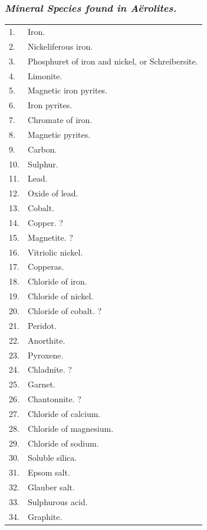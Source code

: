 \documentclass[a4paper, 12pt, oneside]{article}
\begin{document}
\subsubsection{\emph{Mineral Species found in Aërolites.}}
\begin{table}[H]
    \centering
    \bfseries
    \Fontauri
    \footnotesize
    \begin{tabular}{l l}
        1. & Iron. \\
        2. & Nickeliferous iron. \\
        3. & Phosphuret of iron and nickel, or Schreibersite. \\
        4. & Limonite. \\
        5. & Magnetic iron pyrites. \\
        6. & Iron pyrites. \\
        7. & Chromate of iron. \\
        8. & Magnetic pyrites. \\
        9. & Carbon. \\
        10. & Sulphur. \\
        11. & Lead. \\
        12. & Oxide of lead. \\
        13. & Cobalt. \\
        14. & Copper. ? \\
        15. & Magnetite. ? \\
        16. & Vitriolic nickel. \\
        17. & Copperas. \\
        18. & Chloride of iron. \\
        19. & Chloride of nickel. \\
        20. & Chloride of cobalt. ? \\
        21. & Peridot. \\
        22. & Anorthite. \\
        23. & Pyroxene. \\
        24. & Chladnite. ? \\
        25. & Garnet. \\
        26. & Chantonnite. ? \\
        27. & Chloride of calcium. \\
        28. & Chloride of magnesium. \\
        29. & Chloride of sodium. \\
        30. & Soluble silica. \\
        31. & Epsom salt. \\
        32. & Glauber salt. \\
        33. & Sulphurous acid. \\
        34. & Graphite. \\
    \end{tabular}
\end{table}
\end{document}
